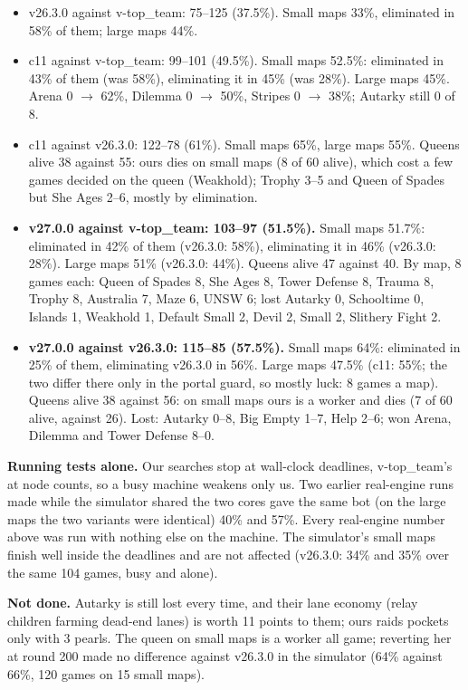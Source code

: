 \documentclass[11pt,a4paper]{article}
\begin{document}
\begin{itemize}
  \item v26.3.0 against v-top\_team: 75--125 (37.5\%). Small maps 33\%, eliminated in 58\% of them; large maps 44\%.
  \item c11 against v-top\_team: 99--101 (49.5\%). Small maps 52.5\%: eliminated in 43\% of them (was 58\%), eliminating it
        in 45\% (was 28\%). Large maps 45\%. Arena 0 $\rightarrow$ 62\%, Dilemma 0 $\rightarrow$ 50\%, Stripes 0 $\rightarrow$
        38\%; Autarky still 0 of 8.
  \item c11 against v26.3.0: 122--78 (61\%). Small maps 65\%, large maps 55\%. Queens alive 38 against 55: ours dies on small
        maps (8 of 60 alive), which cost a few games decided on the queen (Weakhold); Trophy 3--5 and Queen of Spades but
        She Ages 2--6, mostly by elimination.
  \item \textbf{v27.0.0 against v-top\_team: 103--97 (51.5\%).} Small maps 51.7\%: eliminated in 42\% of them (v26.3.0:
        58\%), eliminating it in 46\% (v26.3.0: 28\%). Large maps 51\% (v26.3.0: 44\%). Queens alive 47 against 40. By map,
        8 games each: Queen of Spades 8, She Ages 8, Tower Defense 8, Trauma 8, Trophy 8, Australia 7, Maze 6, UNSW 6; lost
        Autarky 0, Schooltime 0, Islands 1, Weakhold 1, Default Small 2, Devil 2, Small 2, Slithery Fight 2.
  \item \textbf{v27.0.0 against v26.3.0: 115--85 (57.5\%).} Small maps 64\%: eliminated in 25\% of them, eliminating
        v26.3.0 in 56\%. Large maps 47.5\% (c11: 55\%; the two differ there only in the portal guard, so mostly luck: 8 games
        a map). Queens alive 38 against 56: on small maps ours is a worker and dies (7 of 60 alive, against 26). Lost:
        Autarky 0--8, Big Empty 1--7, Help 2--6; won Arena, Dilemma and Tower Defense 8--0.
\end{itemize}
\textbf{Running tests alone.} Our searches stop at wall-clock deadlines, v-top\_team's at node counts, so a busy machine
weakens only us. Two earlier real-engine runs made while the simulator shared the two cores gave the same bot (on the large
maps the two variants were identical) 40\% and 57\%. Every real-engine number above was run with nothing else on the
machine. The simulator's small maps finish well inside the deadlines and are not affected (v26.3.0: 34\% and 35\% over the
same 104 games, busy and alone).

\textbf{Not done.} Autarky is still lost every time, and their lane economy (relay children farming dead-end lanes) is
worth 11 points to them; ours raids pockets only with 3 pearls. The queen on small maps is a worker all game; reverting her
at round 200 made no difference against v26.3.0 in the simulator (64\% against 66\%, 120 games on 15 small maps).
\end{document}
